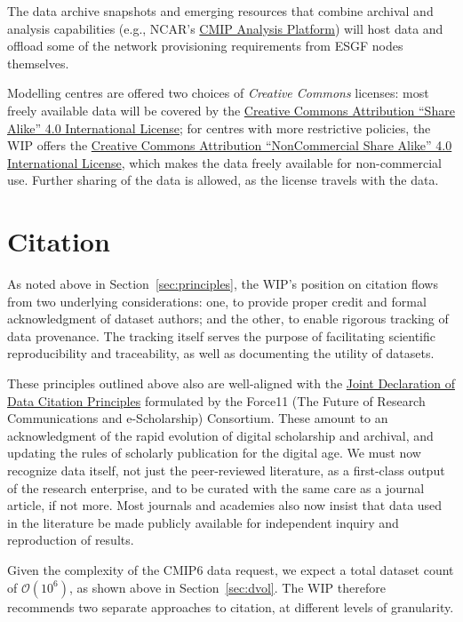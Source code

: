 \documentclass[gmd,manuscript]{copernicus}
\newcommand{\secref}[1] {\mbox{Section  \ref{sec:#1}}}
\begin{document}
The data archive snapshots and emerging resources that combine
archival and analysis capabilities (e.g., NCAR's
\href{https://goo.gl/sYTxC2}{CMIP Analysis Platform}) will host data
and offload some of the network provisioning requirements from ESGF
nodes themselves.

Modelling centres are offered two choices of \emph{Creative Commons
}licenses: most freely available data will be covered by the
\href{https://goo.gl/CY5m2v}{Creative Commons Attribution ``Share
  Alike'' 4.0 International License}; for centres with more
restrictive policies, the WIP offers the
\href{https://goo.gl/KUNUKq}{Creative Commons Attribution
  ``NonCommercial Share Alike'' 4.0 International License}, which
makes the data freely available for non-commercial use. Further
sharing of the data is allowed, as the license travels with the data.

\section{Citation}
\label{sec:cite}

As noted above in \secref{principles}, the WIP's position on citation
flows from two underlying considerations: one, to provide proper
credit and formal acknowledgment of dataset authors; and the other, to
enable rigorous tracking of data provenance. The tracking itself
serves the purpose of facilitating scientific reproducibility and
traceability, as well as documenting the utility of datasets.

These principles outlined above also are well-aligned with the
\href{https://goo.gl/Pzb7F6}{Joint Declaration of Data Citation 
Principles} formulated by the Force11 (The Future of Research
Communications and e-Scholarship) Consortium. These amount to an
acknowledgment of the rapid evolution of digital scholarship and
archival, and updating the rules of scholarly publication for the
digital age. We must now recognize data itself, not just the
peer-reviewed literature, as a first-class output of the research
enterprise, and to be curated with the same care as a journal article,
if not more. Most journals and academies also now insist that data used
in the literature be made publicly available for independent
inquiry and reproduction of results.

Given the complexity of the CMIP6 data request, we expect a total
dataset count of $\mathcal{O}(10^6)$, as shown above in \secref{dvol}.
The WIP therefore recommends two separate approaches to citation, at
different levels of granularity.
\end{document}
